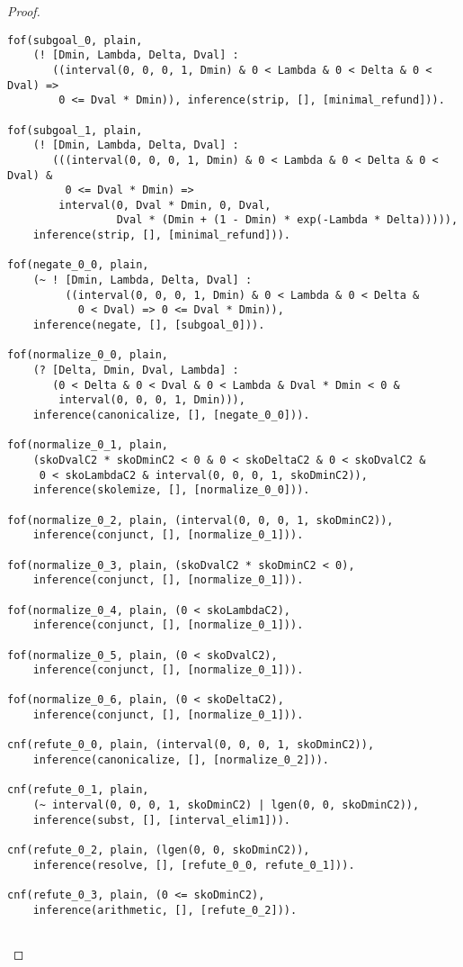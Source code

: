 \begin{proof}
\begin{verbatim}
fof(subgoal_0, plain,
    (! [Dmin, Lambda, Delta, Dval] :
       ((interval(0, 0, 0, 1, Dmin) & 0 < Lambda & 0 < Delta & 0 < Dval) =>
        0 <= Dval * Dmin)), inference(strip, [], [minimal_refund])).

fof(subgoal_1, plain,
    (! [Dmin, Lambda, Delta, Dval] :
       (((interval(0, 0, 0, 1, Dmin) & 0 < Lambda & 0 < Delta & 0 < Dval) &
         0 <= Dval * Dmin) =>
        interval(0, Dval * Dmin, 0, Dval,
                 Dval * (Dmin + (1 - Dmin) * exp(-Lambda * Delta))))),
    inference(strip, [], [minimal_refund])).

fof(negate_0_0, plain,
    (~ ! [Dmin, Lambda, Delta, Dval] :
         ((interval(0, 0, 0, 1, Dmin) & 0 < Lambda & 0 < Delta &
           0 < Dval) => 0 <= Dval * Dmin)),
    inference(negate, [], [subgoal_0])).

fof(normalize_0_0, plain,
    (? [Delta, Dmin, Dval, Lambda] :
       (0 < Delta & 0 < Dval & 0 < Lambda & Dval * Dmin < 0 &
        interval(0, 0, 0, 1, Dmin))),
    inference(canonicalize, [], [negate_0_0])).

fof(normalize_0_1, plain,
    (skoDvalC2 * skoDminC2 < 0 & 0 < skoDeltaC2 & 0 < skoDvalC2 &
     0 < skoLambdaC2 & interval(0, 0, 0, 1, skoDminC2)),
    inference(skolemize, [], [normalize_0_0])).

fof(normalize_0_2, plain, (interval(0, 0, 0, 1, skoDminC2)),
    inference(conjunct, [], [normalize_0_1])).

fof(normalize_0_3, plain, (skoDvalC2 * skoDminC2 < 0),
    inference(conjunct, [], [normalize_0_1])).

fof(normalize_0_4, plain, (0 < skoLambdaC2),
    inference(conjunct, [], [normalize_0_1])).

fof(normalize_0_5, plain, (0 < skoDvalC2),
    inference(conjunct, [], [normalize_0_1])).

fof(normalize_0_6, plain, (0 < skoDeltaC2),
    inference(conjunct, [], [normalize_0_1])).

cnf(refute_0_0, plain, (interval(0, 0, 0, 1, skoDminC2)),
    inference(canonicalize, [], [normalize_0_2])).

cnf(refute_0_1, plain,
    (~ interval(0, 0, 0, 1, skoDminC2) | lgen(0, 0, skoDminC2)),
    inference(subst, [], [interval_elim1])).

cnf(refute_0_2, plain, (lgen(0, 0, skoDminC2)),
    inference(resolve, [], [refute_0_0, refute_0_1])).

cnf(refute_0_3, plain, (0 <= skoDminC2),
    inference(arithmetic, [], [refute_0_2])).


\end{verbatim}
\end{proof}
